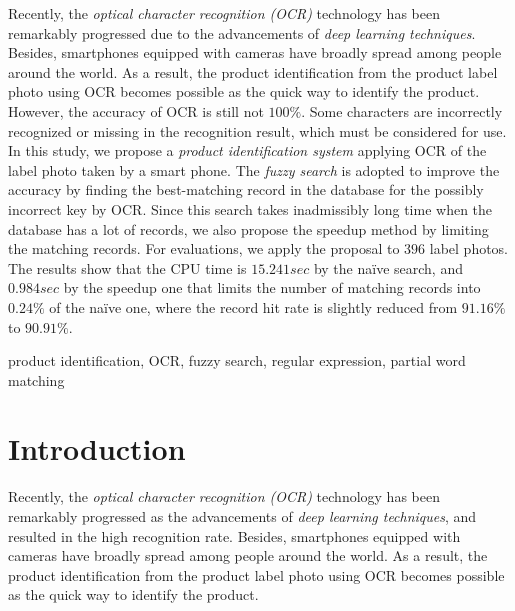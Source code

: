 \documentclass[technicalreport]{ieicej}
\begin{document}

\begin{eabstract}
    Recently, the {\em optical character recognition (OCR)} technology has been remarkably progressed due to the advancements of {\em deep learning techniques}. Besides, smartphones equipped with cameras have broadly spread among people around the world. As a result, the product identification from the product label photo using OCR becomes possible as the quick way to identify the product.
    However, the accuracy of OCR is still not $100\%$. Some characters are incorrectly recognized or missing in the recognition result, which must be considered for use. 
    In this study, we propose a {\em product identification system} applying OCR of the label photo taken by a smart phone. The {\em fuzzy search} is adopted to improve the accuracy by finding the best-matching record in the database for the possibly incorrect key by OCR. Since this search takes inadmissibly long time when the database has a lot of records, we also propose the speedup method by limiting the matching records. 
    For evaluations, we apply the proposal to $396$ label photos. The results show that the CPU time is $15.241sec$ by the naïve search, and $0.984sec$ by the speedup one that limits the number of matching records into $0.24\%$ of the naïve one, where the record hit rate is slightly reduced from $91.16\%$ to $90.91\%$.
\end{eabstract}

\begin{ekeyword}
product identification, OCR, fuzzy search, regular expression, partial word matching
\end{ekeyword}
\maketitle

\section{Introduction}
    Recently, the {\em optical character recognition (OCR)} technology has been remarkably progressed as the advancements of {\em deep learning techniques}, and resulted in the high recognition rate. Besides, smartphones equipped with cameras have broadly spread among people around the world. As a result, the product identification from the product label photo using OCR becomes possible as the quick way to identify the product.
\end{document}
